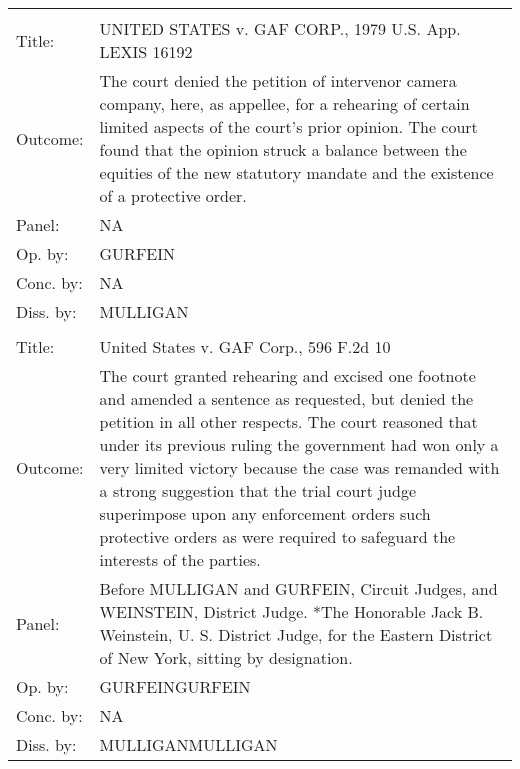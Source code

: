 \documentclass[10pt, letterpaper]{article}
\begin{document}
\begin{spacing}{1.0}
\begin{footnotesize}
\begin{longtable}[H]{lp{6in}}
        \arrayrulecolor{black}\hline\\[-4pt]
        Title: & UNITED STATES v. GAF CORP., 1979 U.S. App. LEXIS 16192\\[2pt]
        Outcome: & The court denied the petition of intervenor camera company, here, as appellee, for a rehearing of certain limited aspects of the court's prior opinion. The court found that the opinion struck a balance between the equities of the new statutory mandate and the existence of a protective order.\\[2pt]
        Panel: & NA\\[2pt]
        Op. by: &  GURFEIN \\[2pt]
        Conc. by: & NA\\[2pt]
        Diss. by: & MULLIGAN \\[2pt]
        \arrayrulecolor{gray}\hline\\[-4pt]
        Title: & United States v. GAF Corp., 596 F.2d 10\\[2pt]
        Outcome: & The court granted rehearing and excised one footnote and amended a sentence as requested, but denied the petition in all other respects. The court reasoned that under its previous ruling the government had won only a very limited victory because the case was remanded with a strong suggestion that the trial court judge superimpose upon any enforcement orders such protective orders as were required to safeguard the interests of the parties.\\[2pt]
        Panel: & Before MULLIGAN and GURFEIN, Circuit Judges, and WEINSTEIN, District Judge.  *The Honorable Jack B. Weinstein, U. S. District Judge, for the Eastern District of New York, sitting by designation.\\[2pt]
        Op. by: & GURFEINGURFEIN \\[2pt]
        Conc. by: & NA\\[2pt]
        Diss. by: & MULLIGANMULLIGAN \\[2pt]
        

\end{longtable}
\end{footnotesize}
\end{spacing}
\end{document}
